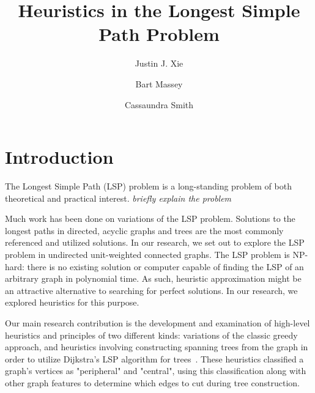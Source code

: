 \documentclass[twocolumn,showpacs,%
  nofootinbib,aps,superscriptaddress,%
  eqsecnum,prd,notitlepage,showkeys,11pt]{article}
\begin{document}
\title{Heuristics in the Longest Simple Path Problem}
\author[1]{Justin J. Xie}
\author[2]{Bart Massey}
\author[2]{Cassaundra Smith}
\date{}



\section{Introduction}

The Longest Simple Path (LSP) problem is a long-standing problem of both theoretical and practical interest. {\em briefly explain the problem}

Much work has been done on variations of the LSP problem. Solutions to the longest paths in directed, acyclic graphs and trees are the most commonly referenced and utilized solutions. In our research, we set out to explore the LSP problem in undirected unit-weighted connected graphs. The LSP problem is NP-hard: there is no existing solution or computer capable of finding the LSP of an arbitrary graph in polynomial time. As such, heuristic approximation might be an attractive alternative to searching for perfect solutions. In our research, we explored heuristics for this purpose.

Our main research contribution is the development and examination of high-level heuristics and principles of two different kinds: variations of the classic greedy approach, and heuristics involving constructing spanning trees from the graph in order to utilize Dijkstra's LSP algorithm for trees~\cite{?}. These heuristics classified a graph's vertices as "peripheral" and "central", using this classification along with other graph features to determine which edges to cut during tree construction.
\end{document}
